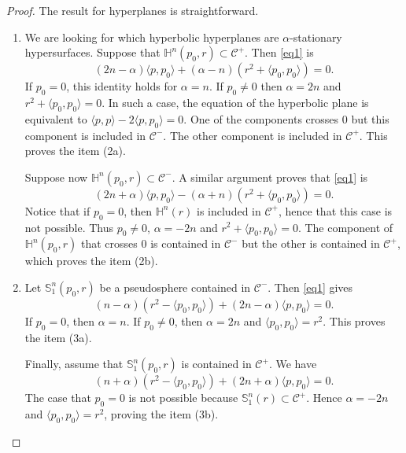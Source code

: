 \documentclass[a4paper,12pt]{amsart}
\theoremstyle{definition}
\def\h{\mathbb H}
\def\s{\mathbb S}
\begin{document}
\begin{proof}
The result for hyperplanes is straightforward. 

\begin{enumerate}
\item We are looking for which hyperbolic hyperplanes are $\alpha$-stationary hypersurfaces. Suppose that  $\h^n(p_0,r)\subset\mathcal{C}^+$. Then \eqref{eq1} is 
$$(2n-\alpha)\langle p,p_0\rangle+(\alpha-n)(r^2+\langle p_0,p_0\rangle)=0.$$
If $p_0=0$, this identity holds for $\alpha=n$. If $p_0\not=0$ then $\alpha=2n$ and $r^2+\langle p_0,p_0\rangle=0$. 
In such a case, the equation of the hyperbolic plane is equivalent to $\langle p,p\rangle-2\langle p,p_0\rangle=0$. One of the components crosses $0$ but this component is included in $\mathcal{C}^-$. The other component is included in $\mathcal{C}^+$. This proves the item (2a). 

Suppose now $\h^n(p_0,r)\subset\mathcal{C}^-$. A similar argument proves that  \eqref{eq1} is 
$$(2n+\alpha)\langle p,p_0\rangle-(\alpha+n)(r^2+\langle p_0,p_0\rangle)=0.$$
Notice that if $p_0=0$, then $\h^n(r)$ is included in $\mathcal{C}^+$, hence that this case is not possible. Thus $p_0\not=0$, $\alpha=-2n$ and   $r^2+\langle p_0,p_0\rangle=0$. The component of $\h^n(p_0,r)$ that crosses $0$ is contained in $\mathcal{C}^-$ but the other is contained in $\mathcal{C}^+$, which proves the item (2b). 
 
 \item Let $\s_1^n(p_0,r)$ be a pseudosphere contained in $\mathcal{C}^-$. Then \eqref{eq1} gives
  $$(n-\alpha)(r^2-\langle p_0,p_0\rangle)+(2n-\alpha)\langle p,p_0\rangle=0.$$
If $p_0=0$, then $\alpha=n$. If $p_0\not=0$, then $\alpha=2n$ and $\langle p_0,p_0\rangle=r^2$. This proves the item (3a). 

Finally, assume that $\s_1^n(p_0,r)$ is contained in $\mathcal{C}^+$. We have
 $$(n+\alpha)(r^2-\langle p_0,p_0\rangle)+(2n+\alpha)\langle p,p_0\rangle=0.$$
The case that $p_0=0$ is not possible because $\s_1^n(r)\subset \mathcal{C}^+$. Hence $\alpha=-2n$ and $\langle p_0,p_0\rangle=r^2$, proving the item (3b). 


  \end{enumerate}
\end{proof}
 
\end{document}
